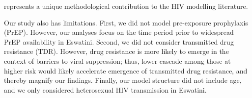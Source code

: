 represents a unique methodological contribution to the HIV modelling literature.
\par
Our study also has limitations.
First, we did not model pre-exposure prophylaxis (PrEP).
However, our analyses focus on the time period
prior to widespread PrEP availability in Eswatini.
Second, we did not consider transmitted drug resistance (TDR).
However, drug resistance is more likely to emerge
in the context of barriers to viral suppression;
thus, lower cascade among those at higher risk
would likely accelerate emergence of transmitted drug resistance,
and thereby magnify our findings.
Finally, our model structure did not include age,
and we only considered heterosexual HIV transmission in Eswatini.

